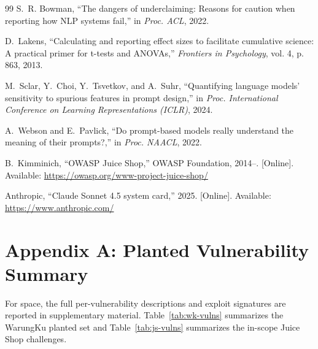 \documentclass[conference]{IEEEtran}
\begin{document}
\begin{thebibliography}{99}
S.~R. Bowman, ``The dangers of underclaiming: Reasons for caution when reporting how NLP systems fail,'' in \emph{Proc. ACL}, 2022.

D.~Lakens, ``Calculating and reporting effect sizes to facilitate cumulative science: A practical primer for t-tests and ANOVAs,'' \emph{Frontiers in Psychology}, vol. 4, p. 863, 2013.

M.~Sclar, Y.~Choi, Y.~Tsvetkov, and A.~Suhr, ``Quantifying language models' sensitivity to spurious features in prompt design,'' in \emph{Proc. International Conference on Learning Representations (ICLR)}, 2024.

A.~Webson and E.~Pavlick, ``Do prompt-based models really understand the meaning of their prompts?,'' in \emph{Proc. NAACL}, 2022.

B.~Kimminich, ``OWASP Juice Shop,'' OWASP Foundation, 2014--. [Online]. Available: \url{https://owasp.org/www-project-juice-shop/}

Anthropic, ``Claude Sonnet 4.5 system card,'' 2025. [Online]. Available: \url{https://www.anthropic.com/}

\end{thebibliography}

\appendix
\section*{Appendix A: Planted Vulnerability Summary}

For space, the full per-vulnerability descriptions and exploit signatures are reported in supplementary material. Table~\ref{tab:wk-vulns} summarizes the WarungKu planted set and Table~\ref{tab:js-vulns} summarizes the in-scope Juice Shop challenges.
\end{document}
